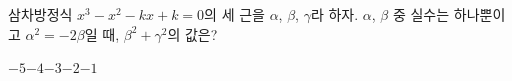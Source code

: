 삼차방정식 $x^3-x^2-kx+k=0$의 세 근을 $\alpha$, $\beta$, $\gamma$라 하자. $\alpha$, $\beta$ 중 실수는 하나뿐이고 $\alpha^2=-2\beta$일 때, $\beta^2+\gamma^2$의 값은? 
\begin{choices32}{$-5$}{$-4$}{$-3$}{$-2$}{$-1$}\end{choices32}
